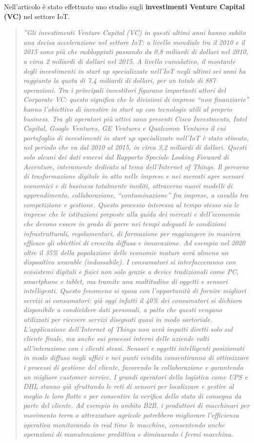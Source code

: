 \documentclass[a4paper]{report} %
\begin{document}
Nell'articolo \cite{art:rif.22} è stato effettuato uno studio sugli \textbf{investimenti Venture Capital (VC)} nel settore IoT.
\begin{quote}
	\textit{''Gli investimenti Venture Capital (VC) in questi ultimi anni hanno subito una decisa accelerazione nel settore IoT: a livello mondiale tra il 2010 e il 2015 sono più che raddoppiati passando da 0,8 miliardi di dollari nel 2010, a circa 2 miliardi di dollari nel 2015. A livello cumulativo, il montante degli investimenti in start up specializzate nell’IoT negli ultimi sei anni ha raggiunto la quota di 7,4 miliardi di dollari, per un totale di 887 operazioni. Tra i principali investitori figurano importanti attori del Corporate VC: questo significa che le divisioni di imprese “non finanziarie” hanno l’obiettivo di investire in start up con tecnologie utili al proprio business. Tra gli operatori più attivi sono presenti Cisco Investments, Intel Capital, Google Ventures, GE Ventures e Qualcomm Ventures il cui portafoglio di investimenti in start up specializzate nell’IoT è stato stimato, nel periodo che va dal 2010 al 2015, in circa 3,2 miliardi di dollari. Questi solo alcuni dei dati emersi dal Rapporto Speciale Looking Forward di Accenture, interamente dedicato al tema dell’Internet of Things.
	Il percorso di trasformazione digitale in atto nelle imprese e nei mercati apre scenari economici e di business totalmente inediti, attraverso nuovi modelli di apprendimento, collaborazione, “contaminazione” fra imprese, a cavallo tra competizione e gestione. Questo processo interessa al tempo stesso sia le imprese che le istituzioni preposte alla guida dei mercati e dell’economia che devono essere in grado di porre nei tempi adeguati le condizioni infrastrutturali, regolamentari, di formazione per raggiungere in maniera efficace gli obiettivi di crescita diffusa e innovazione. Ad esempio nel 2020 oltre il 35\% della popolazione delle economie mature avrà almeno un dispositivo wearable (indossabile). I consumatori si interfacceranno con ecosistemi digitali e fisici non solo grazie a device tradizionali come PC, smartphone e tablet, ma tramite una moltitudine di oggetti e sensori intelligenti. Questo fenomeno si sposa con l’opportunità di fornire migliori servizi ai consumatori: già oggi infatti il 40\% dei consumatori si dichiara disponibile a condividere dati personali, a patto che questi vengano utilizzati per ricevere servizi disegnati quasi in modo sartoriale. L’applicazione dell’Internet of Things non avrà impatti diretti solo sul cliente finale, ma anche sui processi interni delle aziende volti all’interazione con i clienti stessi. Sensori e oggetti intelligenti posizionati in modo diffuso negli uffici e nei punti vendita consentiranno di ottimizzare i processi di gestione del cliente, favorendo la collaborazione e garantendo un migliore customer service. I grandi operatori della logistica come UPS e DHL stanno già sfruttando le reti di sensori per localizzare e gestire al meglio le loro flotte e per consentire la verifica dello stato di consegna da parte del cliente. Ad esempio in ambito B2B, i produttori di macchinari per movimento terra o attrezzature agricole potrebbero migliorare l’efficienza operativa monitorando in real time le macchine, consentendo anche operazioni di manutenzione predittiva e diminuendo i fermi macchina. 
}
\end{quote}
\end{document}
